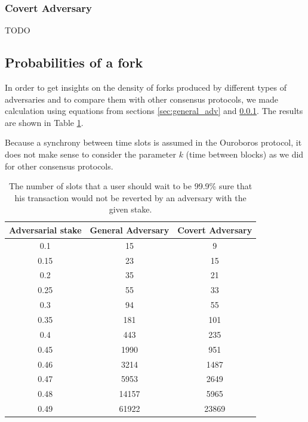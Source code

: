 \documentclass[10pt,a4paper]{article}
\numberwithin{equation}{section} %
\theoremstyle{plain}
\theoremstyle{definition}
\theoremstyle{remark}
\begin{document}
    \subsubsection{Covert Adversary} \label{sec:covert_adv}
    
    TODO
    
    \subsection{Probabilities of a fork}
    
    In order to get insights on the density of forks produced by different types of adversaries and to compare them with other consensus protocols, we made calculation using equations from sections \ref{sec:general_adv} and \ref{sec:covert_adv}. The results are shown in Table \ref{tbl:ouroboros_fork_lengths}.
    
    Because a synchrony between time slots is assumed in the Ouroboros protocol, it does not make sense to consider the parameter \(k\) (time between blocks) as we did for other consensus protocols.
    \begin{table}[h!]
        \label{tbl:ouroboros_fork_lengths}
        \centering
    \begin{tabular}{ | c || c | c | }
         \hline 
         Adversarial stake & General Adversary & Covert Adversary \\
         \hline
         0.1   & 15  & 9   \\
         0.15  & 23  & 15  \\
         0.2   & 35  & 21  \\
         0.25  & 55  & 33  \\
         0.3   & 94  & 55  \\
         0.35  & 181 & 101 \\
         0.4   & 443 & 235 \\
         0.45  & 1990  & 951 \\
         0.46  & 3214  & 1487 \\
         0.47  & 5953  & 2649 \\
         0.48  & 14157  & 5965 \\
         0.49  & 61922  & 23869 \\
         \hline
    \end{tabular}
    \caption{The number of slots that a user should wait to be 99.9\% sure that his transaction would not be reverted by an adversary with the given stake.}
    \end{table}
	
\end{document}
